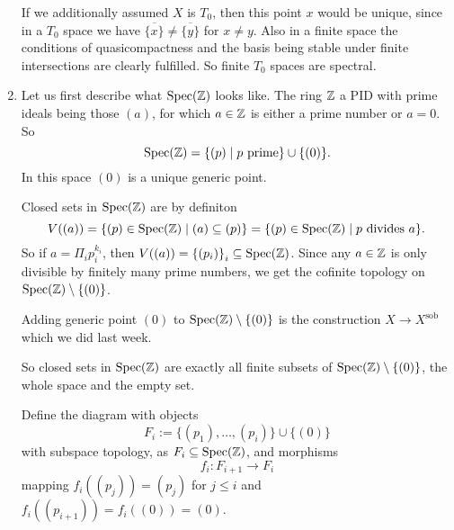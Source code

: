 \begin{exercise}{1}
\begin{enumerate}
{                If we additionally assumed $X$ is $T_0$, then this point $x$
                would be unique, since in a $T_0$ space we have
                $\overline{\{x\}} \not= \overline{\{y\}}$ for $x \not= y$. Also
                in a finite space the conditions of quasicompactness and the
                basis being stable under finite intersections are clearly
                fulfilled. So finite $T_0$ spaces are spectral.
            }
        \item{
                Let us first describe what $\operatorname{Spec}(\mathbb{Z})$ looks like. The ring $\mathbb{Z}$ a PID
                with prime ideals being those $(a)$, for which $a \in \mathbb{Z}$ is
                either a prime number or $a = 0$. So
                \begin{equation*}
                    \operatorname{Spec}(\mathbb{Z}) = \{ (p) \mid p\ \text{prime} \} \cup \{ (0) \}.
                \end{equation*}
                In this space $(0)$ is a unique generic point.

                Closed sets in $\operatorname{Spec}(\mathbb{Z})$ are by definiton
                \begin{equation*}
                    V((a)) = \{ (p) \in \operatorname{Spec}(\mathbb{Z}) \mid (a) \subseteq (p) \} = 
                    \{ (p) \in \operatorname{Spec}(\mathbb{Z}) \mid p\ \text{divides}\ a \}.
                \end{equation*}
                So if $a = \Pi_{i} p^{k_i}_i$, then $V((a)) = {\{ (p_i) \}}_i
                \subseteq \operatorname{Spec}(\mathbb{Z})$. Since any $a \in \mathbb{Z}$ is only divisible by
                finitely many prime numbers, we get the cofinite topology on
                $\operatorname{Spec}(\mathbb{Z}) \setminus \{(0)\}$.

                Adding generic point $(0)$ to $\operatorname{Spec}(\mathbb{Z}) \setminus \{(0)\}$ is
                the construction $X \rightarrow X^{\text{sob}}$ which we did
                last week.

                So closed sets in $\operatorname{Spec}(\mathbb{Z})$ are exactly all finite subsets of
                $\operatorname{Spec}(\mathbb{Z}) \setminus \{(0)\}$, the whole space and the empty
                set.

                Define the diagram with objects
                \begin{equation*}
                    F_i := \{ (p_1), \dots, (p_i) \} \cup \{ (0) \}
                \end{equation*}
                with subspace topology, as $F_i \subseteq \operatorname{Spec}(\mathbb{Z})$,
                and morphisms
                \begin{equation*}
                    f_i \colon F_{i+1} \rightarrow F_i
                \end{equation*}
                mapping $f_i((p_j)) = (p_j)$ for $j \leq i$ and $f_i((p_{i+1}))
                = f_i((0)) = (0)$.

}
\end{enumerate}
\end{exercise}

